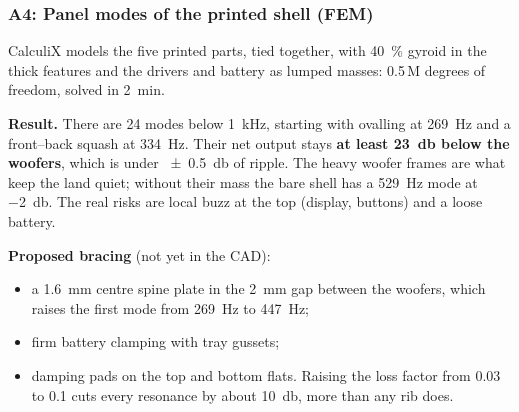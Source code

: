 \subsubsection{A4: Panel modes of the printed shell (FEM)}\label{sec:a4}

CalculiX models the five printed parts, tied together, with \qty{40}{\percent} gyroid in the thick features and the drivers and battery as lumped masses: 0.5\,M degrees of freedom, solved in \qty{2}{\minute}.

\textbf{Result.} There are 24 modes below \qty{1}{\kilo\hertz}, starting with ovalling at \qty{269}{\hertz} and a front--back squash at \qty{334}{\hertz}. Their net output stays \textbf{at least \qty{23}{\decibel} below the woofers}, which is under \qty{\pm0.5}{\decibel} of ripple. The heavy woofer frames are what keep the land quiet; without their mass the bare shell has a \qty{529}{\hertz} mode at \qty{-2}{\decibel}. The real risks are local buzz at the top (display, buttons) and a loose battery.

\textbf{Proposed bracing} (not yet in the CAD):
\begin{itemize}
  \item a \qty{1.6}{\milli\metre} centre spine plate in the \qty{2}{\milli\metre} gap between the woofers, which raises the first mode from \qty{269}{\hertz} to \qty{447}{\hertz};
  \item firm battery clamping with tray gussets;
  \item damping pads on the top and bottom flats. Raising the loss factor from 0.03 to 0.1 cuts every resonance by about \qty{10}{\decibel}, more than any rib does.
\end{itemize}

